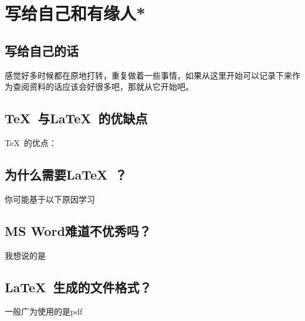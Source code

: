 		\chapter{\mbox{写给自己和有缘人}*}
		
		\section{写给自己的话}
感觉好多时候都在原地打转，重复做着一些事情，如果从这里开始可以记录下来作为查阅资料的话应该会好很多吧，那就从它开始吧。	
		\section{\TeX\ 与\LaTeX\ 的优缺点}
		\TeX\ 的优点：
		\section{为什么需要\LaTeX\ ？}
		你可能基于以下原因学习
		\section{MS Word难道不优秀吗？}
		我想说的是
		\section{\LaTeX\ 生成的文件格式？}
		一般广为使用的是pdf
